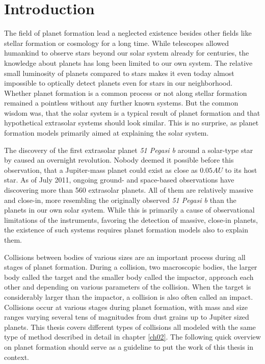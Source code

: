\cleardoublepage
\chapter{Introduction}
\label{ch01}
\graphicspath{{./01figs/}}

The field of planet formation lead a neglected existence besides other fields like stellar formation or cosmology for a long time. While telescopes allowed humankind to observe stars beyond our solar system already for centuries, the knowledge about planets has long been limited to our own system. The relative small luminosity of planets compared to stars makes it even today almost impossible to optically detect planets even for stars in our neighborhood. Whether planet formation is a common process or not along stellar formation remained a pointless without any further known systems. But the common wisdom was, that the solar system is a typical result of planet formation and that hypothetical extrasolar systems should look similar. This is no surprise, as planet formation models primarily aimed at explaining the solar system.

The discovery of the first extrasolar planet \emph{51 Pegasi b} around a solar-type star by \cite{1995Natur.378..355M} caused an overnight revolution. Nobody deemed it possible before this observation, that a Jupiter-mass planet could exist as close as $0.05 AU$ to its host star. As of July 2011, ongoing ground- and space-based observations have discovering more than 560 extrasolar planets. All of them are relatively massive and close-in, more resembling the originally observed \emph{51 Pegasi b} than the planets in our own solar system. While this is primarily a cause of observational limitations of the instruments, favoring the detection of massive, close-in planets, the existence of such systems requires planet formation models also to explain them.

Collisions between bodies of various sizes are an important process during all stages of planet formation. During a collision, two macroscopic bodies, the larger body called the target and the smaller body called the impactor, approach each other and depending on various parameters of the collision. When the target is considerably larger than the impactor, a collision is also often called an impact. Collisions occur at various stages during planet formation, with mass and size ranges varying several tens of magnitudes from dust grains up to Jupiter sized planets. This thesis covers different types of collisions all modeled with the same type of method described in detail in chapter \ref{ch02}. The following quick overview on planet formation should serve as a guideline to put the work of this thesis in context.

